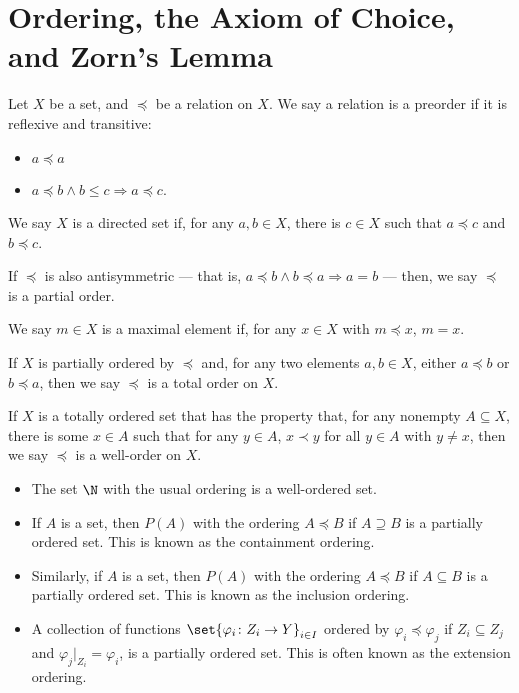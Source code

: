 \section{Ordering, the Axiom of Choice, and Zorn's Lemma}%
\begin{definition}
Let $X$ be a set, and $\preceq $ be a relation on $X$. We say a relation is a preorder if it is reflexive and transitive:
\begin{itemize}
  \item $a\preceq a$
  \item $a\preceq b \wedge b\leq c\Rightarrow a\preceq c$.
\end{itemize}
We say $X$ is a directed set if, for any $a,b\in X$, there is $c\in X$ such that $a\preceq c$ and $b\preceq c$.\newline

If $\preceq$ is also antisymmetric --- that is, $a\preceq b\wedge b\preceq a \Rightarrow a = b$ --- then, we say $\preceq$ is a partial order.\newline

We say $m\in X$ is a maximal element if, for any $x\in X$ with $m\preceq x$, $m = x$.\newline

If $X$ is partially ordered by $\preceq$ and, for any two elements $a,b\in X$, either $a\preceq b$ or $b\preceq a$, then we say $\preceq$ is a total order on $X$.\newline

If $X$ is a totally ordered set that has the property that, for any nonempty $A\subseteq X$, there is some $x\in A$ such that for any $y\in A$, $x\prec y$ for all $y \in A$ with $y\neq x$, then we say $\preceq$ is a well-order on $X$.
\end{definition}
\begin{example}\hfill
  \begin{itemize}
    \item The set $\N$ with the usual ordering is a well-ordered set.
    \item If $A$ is a set, then $P(A)$ with the ordering $A\preceq B$ if $A\supseteq B$ is a partially ordered set. This is known as the containment ordering.
    \item Similarly, if $A$ is a set, then $P(A)$ with the ordering $A\preceq B$ if $A\subseteq B$ is a partially ordered set. This is known as the inclusion ordering.
    \item A collection of functions $\set{\varphi_{i}\colon Z_i\rightarrow Y}_{i\in I}$ ordered by $\varphi_{i}\preceq \varphi_j$ if $Z_i\subseteq Z_j$ and $\varphi_{j}|_{Z_i} = \varphi_i$, is a partially ordered set. This is often known as the extension ordering.
  \end{itemize}
\end{example}
